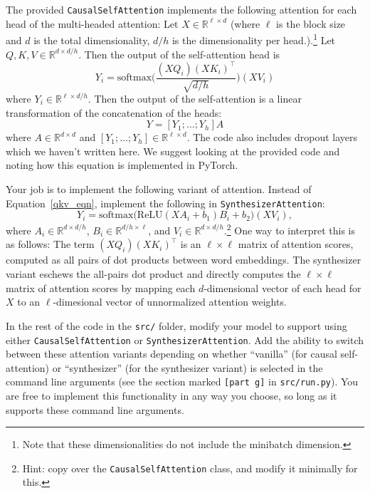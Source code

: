 \begin{parts}
    The provided \texttt{CausalSelfAttention} implements the following attention for each head of the multi-headed attention:
    Let $X\in \mathbb{R}^{\ell \times d}$ (where $\ell$ is the block size and $d$ is the total dimensionality, $d/h$ is the dimensionality per head.).\footnote{Note that these dimensionalities do not include the minibatch dimension.}
    Let $Q,K,V \in \mathbb{R}^{d\times d/h}$.
    Then the output of the self-attention head is
    \begin{equation}
        \label{qkv_eqn}
        Y_i = \text{softmax}\bigg(\frac{(XQ_i)(XK_i)^\top}{\sqrt{d/h}}\bigg)(XV_i)
    \end{equation}
    where $Y_i\in\mathbb{R}^{\ell \times d/h}$.
    Then the output of the self-attention is a linear transformation of the concatenation of the heads:
    \begin{equation}
        Y = [Y_1;\dots;Y_h]A
    \end{equation}
    where $A \in\mathbb{R}^{d\times d}$ and $[Y_1;\dots;Y_h]\in\mathbb{R}^{\ell \times d}$.
    The code also includes dropout layers which we haven't written here.
    We suggest looking at the provided code and noting how this equation is implemented in PyTorch.

    Your job is to implement the following variant of attention. Instead of Equation~\ref{qkv_eqn}, implement the following in \texttt{SynthesizerAttention}:
    \begin{equation}
        Y_i = \text{softmax}\big(\text{ReLU}(XA_i+b_1)B_i + b_2 \big)(XV_i),
    \end{equation}
    where $A_i\in\mathbb{R}^{d \times d/h}$, $B_i\in\mathbb{R}^{d/h\times \ell}$, and $V_i\in\mathbb{R}^{d\times d/h}$.\footnote{Hint: copy over the \texttt{CausalSelfAttention} class, and modify it minimally for this.}
    One way to interpret this is as follows: The term $(XQ_i)(XK_i)^\top$ is an $\ell \times \ell$ matrix of attention scores, computed as all pairs of dot products between word embeddings.
    The synthesizer variant eschews the all-pairs dot product and directly computes the $\ell \times \ell$ matrix of attention scores by mapping each $d$-dimensional vector of each head for $X$ to an $\ell$-dimesional vector of unnormalized attention weights.

    In the rest of the code in the \texttt{src/} folder, modify your model to support using either \texttt{CausalSelfAttention} or \texttt{SynthesizerAttention}. Add the ability to switch between these attention variants depending on whether ``vanilla'' (for causal self-attention) or ``synthesizer'' (for the synthesizer variant) is selected in the command line arguments (see the section marked \texttt{[part g]} in \texttt{src/run.py}).
    You are free to implement this functionality in any way you choose, so long as it supports these command line arguments.


\end{parts}
